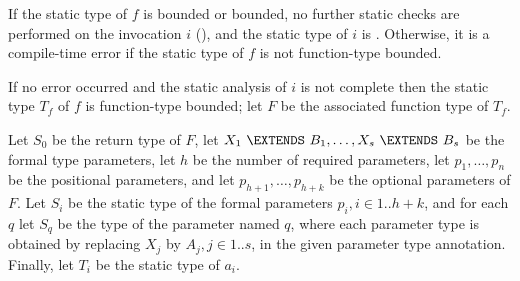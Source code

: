 \documentclass[makeidx]{article}
\begin{document}
{\LMHash{}%
If the static type of $f$ is \DYNAMIC{} bounded or \FUNCTION{} bounded,
no further static checks are performed on the invocation $i$
(),
and the static type of $i$ is \DYNAMIC.
Otherwise, it is a compile-time error if the static type of $f$ is not
function-type bounded.

\LMHash{}%
If no error occurred and the static analysis of $i$ is not complete
then the static type $T_f$ of $f$ is function-type bounded;
let $F$ be the associated function type of $T_f$.

\LMHash{}%
Let $S_0$ be the return type of $F$,
let $X_1\ \EXTENDS\ B_1, \ldots, X_s\ \EXTENDS\ B_s$
be the formal type parameters,
let $h$ be the number of required parameters,
let $p_1, \ldots, p_n$ be the positional parameters,
and let $p_{h+1}, \ldots, p_{h+k}$ be the optional parameters of $F$.
Let $S_i$ be the static type of the formal parameters $p_i, i \in 1 .. h+k$,
and for each $q$ let $S_q$ be the type of the parameter named $q$,
where each parameter type is obtained by replacing $X_j$ by $A_j, j \in 1 .. s$,
in the given parameter type annotation.
Finally, let $T_i$ be the static type of $a_i$.


}
\end{document}

